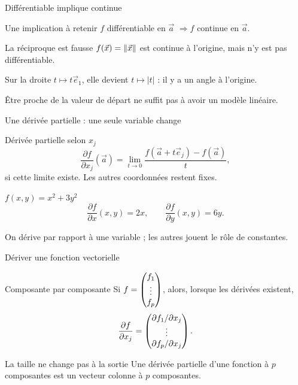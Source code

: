 \begin{frame}[t]{Différentiable implique continue}
\coursanalyse
\begin{theoreme}{Une implication à retenir}
$f$ différentiable en $\vec a$ \quad$\Longrightarrow$\quad $f$ continue en $\vec a$.
\end{theoreme}
\begin{exemple}{La réciproque est fausse}
$f(\vec x)=\lVert \vec x\rVert$ est continue à l'origine, mais n'y est pas différentiable.

\medskip
Sur la droite $t\mapsto t\vec e_1$, elle devient $t\mapsto|t|$ : il y a un angle à l'origine.
\end{exemple}
\vfill Être proche de la valeur de départ ne suffit pas à avoir un modèle linéaire.
\end{frame}

\begin{frame}[t]{Une dérivée partielle : une seule variable change}
\coursanalyse
\begin{notion}{Dérivée partielle selon $x_j$}
\[\frac{\partial f}{\partial x_j}(\vec a)=\lim_{t\to0}\frac{f(\vec a+t\vec e_j)-f(\vec a)}{t},\]
si cette limite existe. Les autres coordonnées restent fixes.
\end{notion}
\begin{exemple}{$f(x,y)=x^2+3y^2$}
\[\frac{\partial f}{\partial x}(x,y)=2x,\qquad\frac{\partial f}{\partial y}(x,y)=6y.\]
\end{exemple}
\vfill On dérive par rapport à une variable ; les autres jouent le rôle de constantes.
\end{frame}

\begin{frame}[t]{Dériver une fonction vectorielle}
\coursanalyse
\begin{theoreme}{Composante par composante}
Si $f=\begin{pmatrix}f_1\\\vdots\\f_p\end{pmatrix}$, alors, lorsque les dérivées existent,
\[\frac{\partial f}{\partial x_j}=\begin{pmatrix}\partial f_1/\partial x_j\\\vdots\\\partial f_p/\partial x_j\end{pmatrix}.\]
\end{theoreme}
\begin{resultat}{La taille ne change pas à la sortie}
Une dérivée partielle d'une fonction à $p$ composantes est un vecteur colonne à $p$ composantes.
\end{resultat}
\end{frame}

